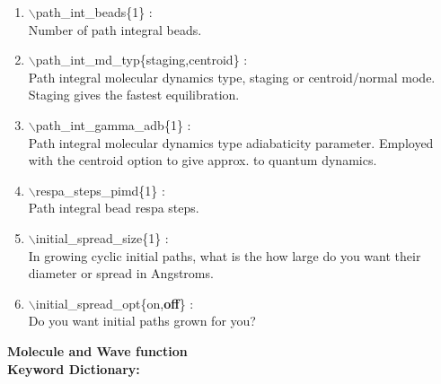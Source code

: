 \documentclass[12pt]{article}
\begin{document}
\begin{itemize}
\begin{enumerate}
 \vspace{0.15in} \Large
 \item  $\backslash$path\_int\_beads\{1\} : \\
    \large
     Number of path integral beads.

 \vspace{0.15in} \Large
 \item  $\backslash$path\_int\_md\_typ\{staging,centroid\} : \\
    \large
     Path integral molecular dynamics type, staging or centroid/normal mode.
     Staging gives the fastest equilibration.

 \vspace{0.15in} \Large
 \item  $\backslash$path\_int\_gamma\_adb\{1\} : \\
    \large
     Path integral molecular dynamics type adiabaticity parameter.
     Employed with the centroid option to give approx. to quantum dynamics.

 \vspace{0.15in} \Large
 \item  $\backslash$respa\_steps\_pimd\{1\} : \\
    \large
     Path integral bead respa steps.

 \vspace{0.15in} \Large
 \item  $\backslash$initial\_spread\_size\{1\} : \\
    \large
    In growing cyclic initial paths, what is the how large do you
    want their diameter or spread in Angstroms.

 \vspace{0.15in} \Large
 \item  $\backslash$initial\_spread\_opt\{on,{\bf off}\} : \\
    \large
    Do you want initial paths grown for you?

\end{enumerate}

\end{itemize}


\clearpage
\begin{center}
\huge
{\bf Molecule and Wave function \\
Keyword Dictionary: } 
\end{center}
\end{document}
